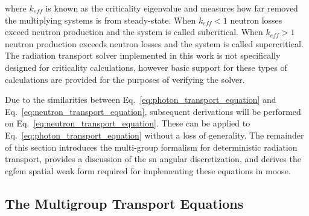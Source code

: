 where $k_{eff}$ is known as the criticality eigenvalue \cite{computational_methods,applied_reactor_physics} and measures how far removed the multiplying systems is from steady-state. When $k_{eff} < 1$ neutron losses exceed  neutron production and the system is called subcritical. When $k_{eff} > 1$ neutron production exceeds neutron losses and the system is called supercritical. The radiation transport solver implemented in this work is not specifically designed for criticality calculations, however basic support for these types of calculations are provided for the purposes of verifying the solver.

Due to the similarities between Eq.~\ref{eq:photon_transport_equation} and Eq.~\ref{eq:neutron_transport_equation}, subsequent derivations will be performed on Eq.~\ref{eq:neutron_transport_equation}. These can be applied to Eq.~\ref{eq:photon_transport_equation} without a loss of generality. The remainder of this section introduces the multi-group formalism for deterministic radiation transport, provides a discussion of the \acrshort{sn} angular discretization, and derives the \acrshort{cgfem} spatial weak form required for implementing these equations in \acrshort{moose}.
 
\subsection{The Multigroup Transport Equations}
\label{solver:radiation_transport:muti_group}

